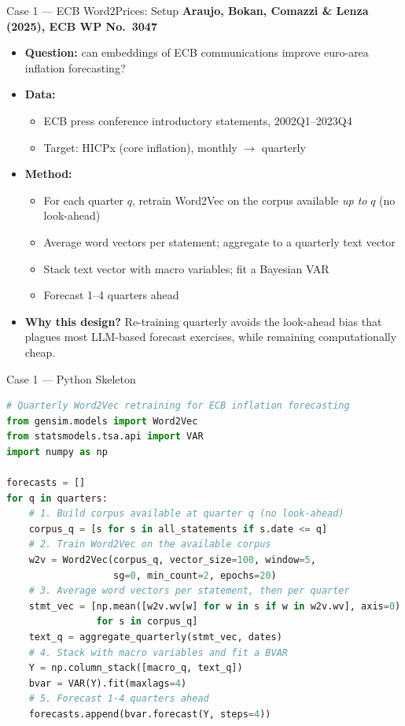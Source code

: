 \begin{frame}{Case 1 --- ECB Word2Prices: Setup}
\textbf{Araujo, Bokan, Comazzi \& Lenza (2025), ECB WP No.\ 3047}

\medskip
\begin{itemize}
\item \textbf{Question:} can embeddings of ECB communications improve euro-area inflation forecasting?

\medskip
\item \textbf{Data:}
\begin{itemize}
    \item ECB press conference introductory statements, 2002Q1--2023Q4
    \item Target: HICPx (core inflation), monthly $\rightarrow$ quarterly
\end{itemize}

\medskip
\item \textbf{Method:}
\begin{itemize}
    \item For each quarter $q$, retrain Word2Vec on the corpus available \emph{up to} $q$ (no look-ahead)
    \item Average word vectors per statement; aggregate to a quarterly text vector
    \item Stack text vector with macro variables; fit a Bayesian VAR
    \item Forecast 1--4 quarters ahead
\end{itemize}

\medskip
\item \textbf{Why this design?} Re-training quarterly avoids the look-ahead bias that plagues most LLM-based forecast exercises, while remaining computationally cheap.
\end{itemize}
\end{frame}

\begin{frame}[fragile]{Case 1 --- Python Skeleton}
\begin{lstlisting}[language=Python, basicstyle=\scriptsize\ttfamily]
# Quarterly Word2Vec retraining for ECB inflation forecasting
from gensim.models import Word2Vec
from statsmodels.tsa.api import VAR
import numpy as np

forecasts = []
for q in quarters:
    # 1. Build corpus available at quarter q (no look-ahead)
    corpus_q = [s for s in all_statements if s.date <= q]
    # 2. Train Word2Vec on the available corpus
    w2v = Word2Vec(corpus_q, vector_size=100, window=5,
                   sg=0, min_count=2, epochs=20)
    # 3. Average word vectors per statement, then per quarter
    stmt_vec = [np.mean([w2v.wv[w] for w in s if w in w2v.wv], axis=0)
                for s in corpus_q]
    text_q = aggregate_quarterly(stmt_vec, dates)
    # 4. Stack with macro variables and fit a BVAR
    Y = np.column_stack([macro_q, text_q])
    bvar = VAR(Y).fit(maxlags=4)
    # 5. Forecast 1-4 quarters ahead
    forecasts.append(bvar.forecast(Y, steps=4))
\end{lstlisting}
\end{frame}

